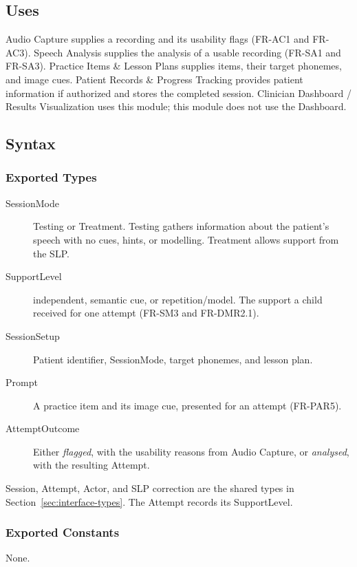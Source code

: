 \documentclass[12pt, titlepage]{article}
\begin{document}
\subsection{Uses}
Audio Capture supplies a recording and its usability flags (FR-AC1 and FR-AC3). Speech Analysis supplies the analysis of a usable recording (FR-SA1 and FR-SA3). Practice Items \& Lesson Plans supplies items, their target phonemes, and image cues. Patient Records \& Progress Tracking provides patient information if authorized and stores the completed session. Clinician Dashboard / Results Visualization uses this module; this module does not use the Dashboard.

\subsection{Syntax}

\subsubsection{Exported Types}
\begin{description}
\item[SessionMode] Testing or Treatment. Testing gathers information about the
patient's speech with no cues, hints, or modelling. Treatment allows support
from the SLP.
\item[SupportLevel] independent, semantic cue, or repetition/model. The support
a child received for one attempt (FR-SM3 and FR-DMR2.1).
\item[SessionSetup] Patient identifier, SessionMode, target phonemes, and
lesson plan.
\item[Prompt] A practice item and its image cue, presented for an attempt
(FR-PAR5).
\item[AttemptOutcome] Either \emph{flagged}, with the usability reasons from
Audio Capture, or \emph{analysed}, with the resulting Attempt.
\end{description}
Session, Attempt, Actor, and SLP correction are the shared types in
Section~\ref{sec:interface-types}. The Attempt records its SupportLevel.

\subsubsection{Exported Constants}
None.
\end{document}
